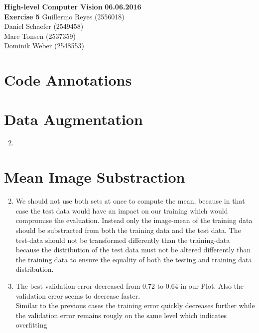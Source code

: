\documentclass[12pt]{article}
\begin{document}

\noindent
{\Large \textbf{High-level Computer Vision}} \hfill \textbf{06.06.2016}\\
{\Large \textbf{Exercise 5}} 
\raggedleft \hfill Guillermo Reyes (2556018)\\
\hfill Daniel Schaefer (2549458)\\
\hfill Marc Tonsen (2537359)\\
\hfill Dominik Weber (2548553)\\

\raggedright


\section*{Code Annotations}




\section{Data Augmentation}

\begin{enumerate}
        \setcounter{enumi}{1}
    \item 
\end{enumerate}


\section{Mean Image Substraction}

\begin{enumerate}
        \setcounter{enumi}{1}
    \item 
        We should not use both sets at once to compute the mean, because in that case the test data would have an impact on our training which would compromise the evaluation. Instead only the image-mean of the training data should be substracted from both the training data and the test data. The test-data should not be transformed differently than the training-data because the distribution of the test data must not be altered differently than the training data to ensure the equality of both the testing and training data distribution. 
    \item
        The best validation error decreased from 0.72 to 0.64 in our Plot. %
        Also the validation error seems to decrease faster.\\
        Similar to the previous cases the training error quickly decreases further while the validation error remains rougly on the same level which indicates overfitting
\end{enumerate}
\end{document}
